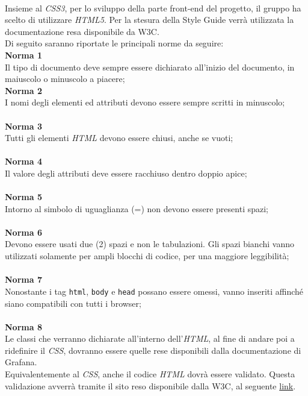 \label{html}\-\\

Insieme al \textit{CSS3}, per lo sviluppo della parte front-end del progetto, il gruppo ha scelto di utilizzare \textit{HTML5}. Per la stesura della Style Guide verrà utilizzata la documentazione resa disponibile da W3C.\\
Di seguito saranno riportate le principali norme da seguire: \\
\textbf{Norma 1}\\
Il tipo di documento deve sempre essere dichiarato all'inizio del documento, in maiuscolo o minuscolo a piacere; \\

\textbf{Norma 2}\\
I nomi degli elementi ed attributi devono essere sempre scritti in minuscolo; \\
\-\\
\textbf{Norma 3}\\
Tutti gli elementi \textit{HTML} devono essere chiusi, anche se vuoti; \\
\-\\
\textbf{Norma 4}\\
Il valore degli attributi deve essere racchiuso dentro doppio apice;\\
\-\\
\textbf{Norma 5}\\
Intorno al simbolo di uguaglianza (=) non devono essere presenti spazi;\\
\-\\
\textbf{Norma 6}\\
Devono essere usati due (2) spazi e non le tabulazioni. Gli spazi bianchi vanno utilizzati solamente per ampli blocchi di codice, per una maggiore leggibilità; \\
\-\\
\textbf{Norma 7}\\
Nonostante i tag \texttt{html}, 	\texttt{body} e \texttt{head} possano essere omessi, vanno inseriti affinché siano compatibili con tutti i browser;\\
\-\\
\textbf{Norma 8}\\
Le classi che verranno dichiarate all'interno dell'\textit{HTML}, al fine di andare poi a ridefinire il \textit{CSS}, dovranno essere quelle rese disponibili dalla documentazione di Grafana.	\\


Equivalentemente al \textit{CSS}, anche il codice \textit{HTML} dovrà essere validato. Questa validazione avverrà tramite il sito reso disponibile dalla W3C, al seguente \href{https://validator.w3.org/}{link}.

